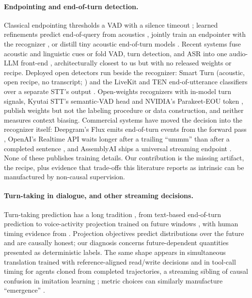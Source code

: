 \documentclass[11pt]{article}
\begin{document}
\paragraph{Endpointing and end-of-turn detection.} Classical endpointing thresholds a VAD \citep{silero2021vad} with a silence timeout \citep{raux2008optimizing}; learned refinements predict end-of-query from acoustics \citep{shannon2017improved}, jointly train an endpointer with the recognizer \citep{chang2019joint,li2020towards,bijwadia2023unified}, or distill tiny acoustic end-of-turn models \citep{helwani2026hierarchical,smartturn2025}. Recent systems fuse acoustic and linguistic cues \citep{fastturn2026,jalturn2026} or fold VAD, turn detection, and ASR into one audio-LLM front-end \citep{uaf2026}, architecturally closest to us but with no released weights or recipe. Deployed open detectors run beside the recognizer: Smart Turn (acoustic, open recipe, no transcript; \citealp{smartturn2025}) and the LiveKit and TEN end-of-utterance classifiers over a separate STT's output \citep{livekit2025turndetector,ten2025turndetection,livekit2026eou}. Open-weights recognizers with in-model turn signals, Kyutai STT's semantic-VAD head \citep{kyutai2025stt} and NVIDIA's Parakeet-EOU token \citep{nvidia2026parakeeteou}, publish weights but not the labeling procedure or data construction, and neither measures context biasing. Commercial systems have moved the decision into the recognizer itself: Deepgram's Flux emits end-of-turn events from the forward pass \citep{deepgram2026flux}, OpenAI's Realtime API waits longer after a trailing ``ummm'' than after a completed sentence \citep{openai2025semanticvad}, and AssemblyAI ships a universal streaming endpoint \citep{assemblyai2025universalstreaming}. None of these publishes training details. Our contribution is the missing artifact, the recipe, plus evidence that trade-offs this literature reports as intrinsic can be manufactured by non-causal supervision.

\paragraph{Turn-taking in dialogue, and other streaming decisions.} Turn-taking prediction has a long tradition \citep{skantze2021review}, from text-based end-of-turn prediction \citep{ekstedt2020turngpt} to voice-activity projection trained on future windows \citep{ekstedt2022vap}, with human timing evidence from \citet{stivers2009universals,levinson2015timing}. Projection objectives predict distributions over the future and are causally honest; our diagnosis concerns future-dependent quantities presented as deterministic labels. The same shape appears in simultaneous translation trained with reference-aligned read/write decisions \citep{ma2019stacl} and in tool-call timing for agents cloned from completed trajectories, a streaming sibling of causal confusion in imitation learning \citep{dehaan2019causal}; metric choices can similarly manufacture ``emergence'' \citep{schaeffer2023mirage}.
\end{document}
